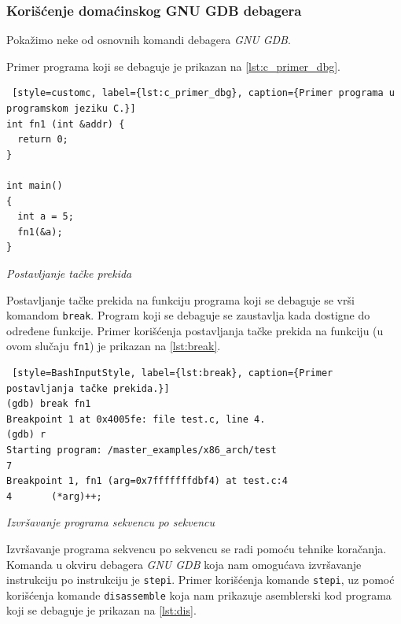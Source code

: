 \documentclass[12pt,oneside]{memoir}
\begin{document}
\subsubsection{Korišćenje domaćinskog GNU GDB debagera}

Pokažimo neke od osnovnih komandi debagera \emph{GNU GDB}.

Primer programa koji se debaguje je prikazan na \ref{lst:c_primer_dbg}.\newpage

\begin{lstlisting} [style=customc, label={lst:c_primer_dbg}, caption={Primer programa u programskom jeziku C.}]
int fn1 (int &addr) {
  return 0;
}

int main()
{
  int a = 5;
  fn1(&a);
}
\end{lstlisting}

\begin{description}

\item{\emph{Postavljanje tačke prekida}}

Postavljanje tačke prekida na funkciju programa koji se debaguje se vrši komandom \texttt{break}. Program koji se debaguje se zaustavlja kada dostigne do određene funkcije. Primer korišćenja postavljanja tačke prekida na funkciju (u ovom slučaju \texttt{fn1}) je prikazan na \ref{lst:break}.

\begin{lstlisting} [style=BashInputStyle, label={lst:break}, caption={Primer postavljanja tačke prekida.}]
(gdb) break fn1
Breakpoint 1 at 0x4005fe: file test.c, line 4.
(gdb) r
Starting program: /master_examples/x86_arch/test 
7
Breakpoint 1, fn1 (arg=0x7fffffffdbf4) at test.c:4
4		(*arg)++;
\end{lstlisting}

\item{\emph{Izvršavanje programa sekvencu po sekvencu}}

Izvršavanje programa sekvencu po sekvencu se radi pomoću tehnike koračanja. Komanda u okviru debagera \emph{GNU GDB} koja nam omogućava izvršavanje instrukciju po instrukciju je \texttt{stepi}. Primer korišćenja komande \texttt{stepi}, uz pomoć korišćenja komande \texttt{disassemble} koja nam prikazuje asemblerski kod programa koji se debaguje je prikazan na \ref{lst:dis}.\newpage


\end{description}
\end{document}
